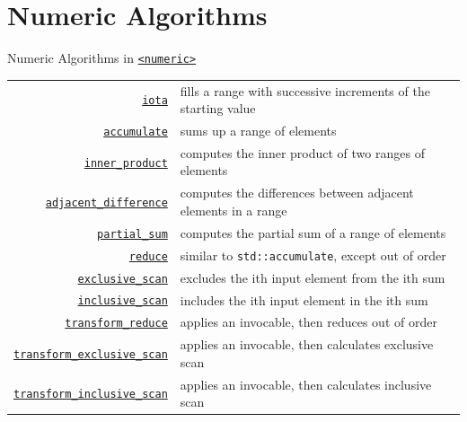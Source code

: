 \documentclass[14pt,aspectratio=1610]{beamer}
\begin{document}
\section{Numeric Algorithms}

\begin{frame}{Numeric Algorithms in \href{https://en.cppreference.com/w/cpp/header/numeric}{\texttt{<numeric>}}}
\footnotesize\renewcommand{\ULdepth}{3pt}\renewcommand{\arraystretch}{1.3}
\begin{tabularx}{\textwidth}{r X}
\href{https://en.cppreference.com/w/cpp/algorithm/iota}{\lstinline{iota}} &
  fills a range with successive increments of the starting value\\
\href{https://en.cppreference.com/w/cpp/algorithm/accumulate}{\lstinline{accumulate}} &
  sums up a range of elements\\
\href{https://en.cppreference.com/w/cpp/algorithm/inner_product}{\lstinline{inner_product}} &
  computes the inner product of two ranges of elements\\
\href{https://en.cppreference.com/w/cpp/algorithm/adjacent_difference}{\lstinline{adjacent_difference}} &
  computes the differences between adjacent elements in a range\\
\href{https://en.cppreference.com/w/cpp/algorithm/partial_sum}{\lstinline{partial_sum}} &
  computes the partial sum of a range of elements\\
\href{https://en.cppreference.com/w/cpp/algorithm/reduce}{\lstinline{reduce}} &
  similar to \texttt{std::accumulate}, except out of order\\
\href{https://en.cppreference.com/w/cpp/algorithm/exclusive_scan}{\lstinline{exclusive_scan}} &
  excludes the ith input element from the ith sum\\
\href{https://en.cppreference.com/w/cpp/algorithm/inclusive_scan}{\lstinline{inclusive_scan}} &
  includes the ith input element in the ith sum\\
\href{https://en.cppreference.com/w/cpp/algorithm/transform_reduce}{\lstinline{transform_reduce}} &
  applies an invocable, then reduces out of order\\
\href{https://en.cppreference.com/w/cpp/algorithm/transform_exclusive_scan}{\lstinline{transform_exclusive_scan}} &
  applies an invocable, then calculates exclusive scan\\
\href{https://en.cppreference.com/w/cpp/algorithm/transform_inclusive_scan}{\lstinline{transform_inclusive_scan}} &
  applies an invocable, then calculates inclusive scan\\
\end{tabularx}
\end{frame}
\end{document}
